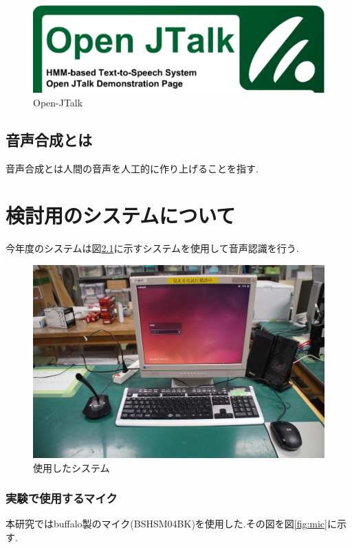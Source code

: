 \documentclass[12pt,oneside]{sotsuken_paper}
\begin{document}
\begin{figure}[htbp]
\begin{center}
\includegraphics[width=120mm]{img/openjtalk.png}
\caption{Open-JTalk}
\label{fig:OpenJTalk}
\end{center}
\end{figure}


\section{音声合成とは}
音声合成とは人間の音声を人工的に作り上げることを指す.


\chapter{検討用のシステムについて}
今年度のシステムは図\ref{fig:robot}に示すシステムを使用して音声認識を行う.


\begin{figure}[htbp]
\begin{center}
\includegraphics[width=120mm]{img/robo.JPG}
\caption{使用したシステム}
\label{fig:robot}
\end{center}
\end{figure}


\subsection{実験で使用するマイク}
本研究ではbuffalo製のマイク(BSHSM04BK)を使用した.その図を図\ref{fig:mic}に示す.
\end{document}
